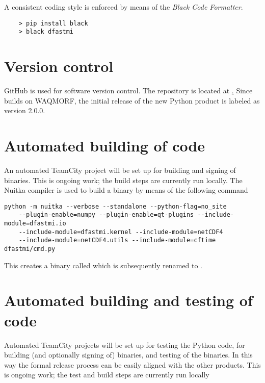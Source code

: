 A consistent coding style is enforced by means of the \emph{Black Code Formatter}.

\begin{Verbatim}
    > pip install black
    > black dfastmi
\end{Verbatim}

\section{Version control}

GitHub is used for software version control.
The repository is located at \href{https://github.com/Deltares/D-FAST_Morphological_Impact}.
Since \dfastmi builds on WAQMORF, the initial release of the new Python product is labeled as version 2.0.0.

\section{Automated building of code}

An automated TeamCity project will be set up for building and signing of binaries.
This is ongoing work; the build steps are currently run locally.
The Nuitka compiler is used to build a binary by means of the following command

\begin{Verbatim}
python -m nuitka --verbose --standalone --python-flag=no_site
    --plugin-enable=numpy --plugin-enable=qt-plugins --include-module=dfastmi.io
    --include-module=dfastmi.kernel --include-module=netCDF4
    --include-module=netCDF4.utils --include-module=cftime dfastmi/cmd.py
\end{Verbatim}

This creates a binary called  which is subsequently renamed to .

\section{Automated building and testing of code}

Automated TeamCity projects will be set up for testing the Python code, for building (and optionally signing of) binaries, and testing of the binaries.
In this way the formal release process can be easily aligned with the other products.
This is ongoing work; the test and build steps are currently run locally


